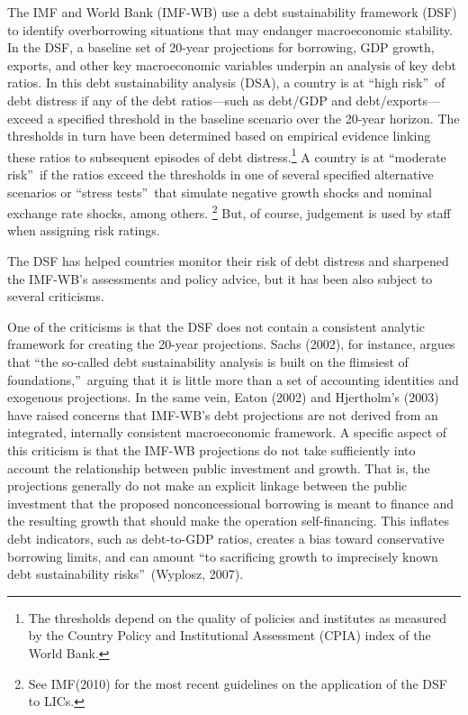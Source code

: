 \documentclass[11pt]{article}
\begin{document}
The IMF and World Bank (IMF-WB) use a debt sustainability framework (DSF) to
identify overborrowing situations that may endanger macroeconomic stability.
In the DSF, a baseline set of 20-year projections for borrowing, GDP growth,
exports, and other key macroeconomic variables underpin an analysis of key
debt ratios. In this debt sustainability analysis (DSA), a country is at
\textquotedblleft high risk\textquotedblright\ of debt distress if any of
the debt ratios---such as debt/GDP and debt/exports---exceed a specified
threshold in the baseline scenario over the 20-year horizon. The thresholds
in turn have been determined based on empirical evidence linking these
ratios to subsequent episodes of debt distress.\footnote{%
The thresholds depend on the quality of policies and institutes as measured
by the Country Policy and Institutional Assessment (CPIA) index of the World
Bank.} A country is at \textquotedblleft moderate risk\textquotedblright\ if
the ratios exceed the thresholds in one of several specified alternative
scenarios or \textquotedblleft stress tests\textquotedblright\ that simulate
negative growth shocks and nominal exchange rate shocks, among others.%
\footnote{%
See IMF(2010) for the most recent guidelines on the application of the DSF
to LICs.} But, of course, judgement is used by staff when assigning risk
ratings.

The DSF has helped countries monitor their risk of debt distress and
sharpened the IMF-WB's assessments and policy advice, but it has been also
subject to several criticisms.

One of the criticisms is that the DSF does not contain a consistent analytic
framework for creating the 20-year projections. Sachs (2002), for instance,
argues that \textquotedblleft the so-called debt sustainability analysis is
built on the flimsiest of foundations,\textquotedblright \thinspace\ arguing
that it is little more than a set of accounting identities and exogenous
projections. In the same vein, Eaton (2002) and Hjertholm's (2003) have
raised concerns that IMF-WB's debt projections are not derived from an
integrated, internally consistent macroeconomic framework. A specific aspect
of this criticism is that the IMF-WB projections do not take sufficiently
into account the relationship between public investment and growth. That is,
the projections generally do not make an explicit linkage between the public
investment that the proposed nonconcessional borrowing is meant to finance
and the resulting growth that should make the operation self-financing. This
inflates debt indicators, such as debt-to-GDP ratios, creates a bias toward
conservative borrowing limits, and can amount \textquotedblleft to
sacrificing growth to imprecisely known debt sustainability
risks\textquotedblright\ (Wyplosz, 2007).
\end{document}
